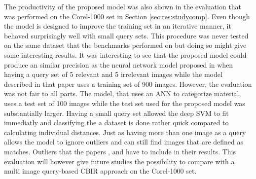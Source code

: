 The productivity of the proposed model was also shown in the evaluation that was performed on the Corel-1000 set in Section \ref{sec:res:studycomp}. Even though the model is designed to improve the training set in an iterative manner, it behaved surprisingly well with small query sets. This procedure was never tested on the same dataset that the benchmarks performed on but doing so might give some interesting results. It was interesting to see that the proposed model could produce an similar precision as the neural network model proposed in \cite{elalami2014new} when having a query set of 5 relevant and 5 irrelevant images while the model described in that paper uses a training set of 900 images. However, the evaluation was not fair to all parts. The model, that uses an ANN to categorize material, uses a test set of 100 images while the test set used for the proposed model was substantially larger. Having a small query set allowed the deep SVM to fit immediatly and classifying the a dataset is done rather quick compared to calculating individual distances. Just as having more than one image as a query allows the model to ignore outliers and can still find images that are defined as matches. Outliers that the papers \cite{wang2001simplicity}, \cite{subrahmanyam2013modified} and \cite{nagaraja2015low} have to include in their results. This evaluation will however give future studies the possibility to compare with a multi image query-based CBIR approach on the Corel-1000 set.
